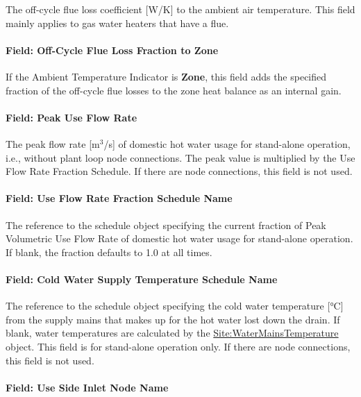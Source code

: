 The off-cycle flue loss coefficient {[}W/K{]} to the ambient air temperature. This field mainly applies to gas water heaters that have a flue.

\paragraph{Field: Off-Cycle Flue Loss Fraction to Zone}\label{field-off-cycle-flue-loss-fraction-to-zone}

If the Ambient Temperature Indicator is \textbf{Zone}, this field adds the specified fraction of the off-cycle flue losses to the zone heat balance as an internal gain.

\paragraph{Field: Peak Use Flow Rate}\label{field-peak-use-flow-rate-1}

The peak flow rate {[}m\(^{3}\)/s{]} of domestic hot water usage for stand-alone operation, i.e., without plant loop node connections. The peak value is multiplied by the Use Flow Rate Fraction Schedule. If there are node connections, this field is not used.

\paragraph{Field: Use Flow Rate Fraction Schedule Name}\label{field-use-flow-rate-fraction-schedule-name-1}

The reference to the schedule object specifying the current fraction of Peak Volumetric Use Flow Rate of domestic hot water usage for stand-alone operation. If blank, the fraction defaults to 1.0 at all times.

\paragraph{Field: Cold Water Supply Temperature Schedule Name}\label{field-cold-water-supply-temperature-schedule-name-1}

The reference to the schedule object specifying the cold water temperature {[}°C{]} from the supply mains that makes up for the hot water lost down the drain. If blank, water temperatures are calculated by the \hyperref[sitewatermainstemperature]{Site:WaterMainsTemperature} object. This field is for stand-alone operation only. If there are node connections, this field is not used.

\paragraph{Field: Use Side Inlet Node Name}\label{field-use-side-inlet-node-name-1-000}

